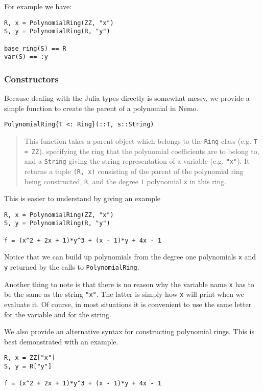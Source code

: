 \documentclass[a4paper,10pt]{article}
\newcommand{\code}{\lstinline}
\newcommand{\desc}[1]{\vspace{-3mm}\begin{quote}#1\end{quote}}
\begin{document}
For example we have:

\begin{lstlisting}
R, x = PolynomialRing(ZZ, "x")
S, y = PolynomialRing(R, "y")

base_ring(S) == R
var(S) == :y
\end{lstlisting}

\subsubsection{Constructors}

Because dealing with the Julia types directly is somewhat messy, we provide a simple
function to create the parent of a polynomial in Nemo.

\begin{lstlisting}
PolynomialRing{T <: Ring}(::T, s::String)
\end{lstlisting}

\desc{This function takes a parent object which belongs to the \code|Ring| class 
(e.g. \code|T = ZZ|), specifying the ring that the polynomial coefficients are to 
belong to, and a \code{String} giving the string representation of a variable (e.g. 
\code|"x"|). It returns a tuple \code|(R, x)| consisting of the parent of the polynomial
ring being constructed, \code|R|, and the degree $1$ polynomial \code|x| in this ring.}

This is easier to understand by giving an example

\begin{lstlisting}
R, x = PolynomialRing(ZZ, "x")
S, y = PolynomialRing(R, "y")

f = (x^2 + 2x + 1)*y^3 + (x - 1)*y + 4x - 1
\end{lstlisting}

Notice that we can build up polynomials from the degree one polynomials \code{x} and
\code{y} returned by the calls to \code{PolynomialRing}. 

Another thing to note is that there is no reason why the variable name \code{x} has
to be the same as the string \code{"x"}. The latter is simply how \code{x} will print
when we evaluate it. Of course, in most situations it is convenient to use the same 
letter for the variable and for the string.

We also provide an alternative syntax for constructing polynomial rings.
This is best demonstrated with an example.

\begin{lstlisting}
R, x = ZZ["x"]
S, y = R["y"]

f = (x^2 + 2x + 1)*y^3 + (x - 1)*y + 4x - 1
\end{lstlisting}
\end{document}
